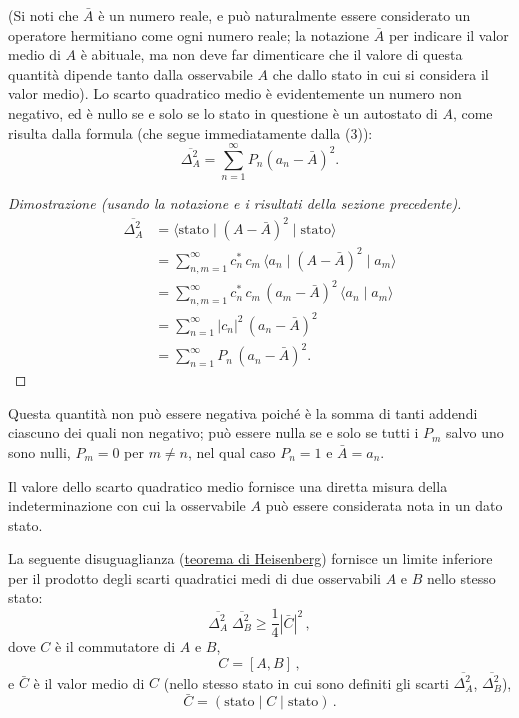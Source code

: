 \documentclass[11pt, a4paper]{book}
\numberwithin{equation}{section}
\begin{document}
(Si noti che $\bar{A}$ è un numero reale, e può naturalmente essere considerato un operatore hermitiano come ogni numero reale; la notazione $\bar{A}$ per indicare il valor medio di $A$ è abituale, ma non deve far dimenticare che il valore di questa quantità dipende tanto dalla osservabile $A$ che dallo stato in cui si considera il valor medio). Lo scarto quadratico medio è evidentemente un numero non negativo, ed è nullo se e solo se lo stato in questione è un autostato di $A$, come risulta dalla formula (che segue immediatamente dalla (3)):
\begin{equation}
\overline{\Delta^2_A} = \sum_{n=1}^{\infty} P_n \left(a_n - \bar{A}\right)^2.
\end{equation}

\begin{proof}[Dimostrazione (usando la notazione e i risultati della sezione precedente)]
\begin{align*}
\overline{\Delta^2_A}
&= \langle \text{stato} \mid (A - \bar{A})^2 \mid \text{stato} \rangle \\
&= \sum_{n,m=1}^{\infty} c_n^* \, c_m \, \langle a_n \mid (A - \bar{A})^2 \mid a_m \rangle \\
&= \sum_{n,m=1}^{\infty} c_n^* \, c_m \, (a_m - \bar{A})^2 \, \langle a_n \mid a_m \rangle \\
&= \sum_{n=1}^{\infty} |c_n|^2 \, (a_n - \bar{A})^2 \\
&= \sum_{n=1}^{\infty} P_n \, (a_n - \bar{A})^2.
\end{align*}
\end{proof}


Questa quantità non può essere negativa poiché è la somma di
tanti addendi ciascuno dei quali non negativo; può essere nulla se e
solo se tutti i $P_m$ salvo uno sono nulli, $P_m = 0$ per $m \neq n$,
nel qual caso $P_n = 1$ e $\bar{A} = a_n$.

Il valore dello scarto quadratico medio fornisce una diretta
misura della indeterminazione con cui la osservabile $A$ può essere
considerata nota in un dato stato.

La seguente disuguaglianza (\underline{teorema di Heisenberg}) fornisce
un limite inferiore per il prodotto degli scarti quadratici medi di due
osservabili $A$ e $B$ nello stesso stato:
\begin{equation}
\overline{\Delta_A^2}\;\overline{\Delta_B^2} \geq \frac{1}{4}\left|\bar{C}\right|^2 \,, \tag{6}
\end{equation}
dove $C$ è il commutatore di $A$ e $B$,
\begin{equation}
C = [A, B] \,, \tag{7}
\end{equation}
e $\bar{C}$ è il valor medio di $C$ (nello stesso stato in cui sono definiti gli
scarti $\overline{\Delta_A^2}$, $\overline{\Delta_B^2}$),
\begin{equation}
\bar{C} = (\text{stato}\mid C \mid\text{stato}) \,. \tag{8}
\end{equation}
\end{document}
